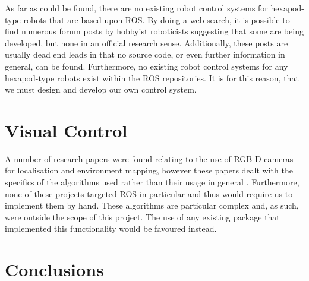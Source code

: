 As far as could be found, there are no existing robot control systems for hexapod-type robots that are based upon ROS. By doing a web search, it is possible to find numerous forum posts by hobbyist roboticists suggesting that some are being developed, but none in an official research sense. Additionally, these posts are usually dead end leads in that no source code, or even further information in general, can be found. Furthermore, no existing robot control systems for any hexapod-type robots exist within the ROS repositories. It is for this reason, that we must design and develop our own control system.


\section{Visual Control}

A number of research papers were found relating to the use of RGB-D cameras for localisation and environment mapping, however these papers dealt with the specifics of the algorithms used rather than their usage in general \cite{correa2012mobile, biswas2012depth, cunha2011using}. Furthermore, none of these projects targeted ROS in particular and thus would require us to implement them by hand. These algorithms are particular complex and, as such, were outside the scope of this project. The use of any existing package that implemented this functionality would be favoured instead.


\section{Conclusions}
